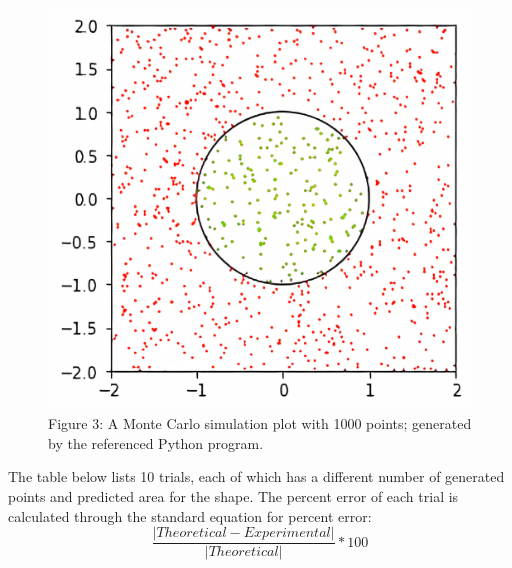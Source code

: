 \documentclass[11pt]{article}
\begin{document}
\begin{figure}[h]
\includegraphics[scale=.19]{circle_populated}
\centering\\
\footnotesize\centering Figure 3: A Monte Carlo simulation plot with 1000 points; generated by the referenced Python program. 
\end{figure} 

\raggedright

\newpage
The table below lists 10 trials, each of which has a different number of generated points and predicted area for the shape. The percent error of each trial is calculated through the standard equation for percent error:\\[-3ex]

\[\frac{|Theoretical-Experimental|}{|Theoretical|}*100\]

 
\end{document}
